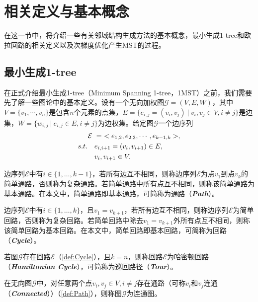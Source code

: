 \section{相关定义与基本概念}
\label{sec:NS_Method:相关定义与基本概念}
在这一节中，将介绍一些有关邻域结构生成方法的基本概念，最小生成1-tree和欧拉回路的相关定义以及次梯度优化产生MST的过程。

\subsection{最小生成1-tree}
\label{subsec:NS_Method:相关定义与基本概念:最小生成1-tree}
在正式介绍最小生成1-tree（Minimum Spanning 1-tree，1MST）之前，我们需要先了解一些图论中的基本定义。设有一个无向加权图$\mathcal{G} = (V, E, W)$，其中$V = \{ v_1, \cdots, v_n \}$是包含$n$个元素的点集，$E = \{ e_{i,j} = (v_i,v_j) \ | \ v_i,v_j \in V, i \not = j \}$是边集，$W = \{ w_{i,j} \ | \ e_{i,j} \in E, i \not = j\} $为边权集。给定图$\mathcal{G}$一个边序列
\begin{align}
    \label{eq:边序列}
    \mathcal{E} \ & = \ <e_{1,2}, e_{2,3}, \cdots, e_{k-1,k}>, \\
    s.t. \quad & e_{i,i+1} = (v_i, v_{i+1}) \in E, \notag  \\
    & v_i, v_{i+1} \in V. \notag 
\end{align}
\begin{definition}[简单通路]
    \label{def:Path}
    边序列$\mathcal{E}$中有$i \in \{ 1, \dots, k-1 \}$，若所有边互不相同，则称边序列$\mathcal{E}$为点$v_1$到点$v_k$的简单通路，否则称为复杂通路。若简单通路中所有点互不相同，则称该简单通路为基本通路。在本文中，简单通路即基本通路，可简称为通路（\emph{\textbf{Path}}）。
\end{definition}
\begin{definition}[简单回路]
    \label{def:Cycle}
    边序列$\mathcal{E}$中有$i \in \{ 1, \dots, k \}$，且$v_1=v_{k+1}$，若所有边互不相同，则称边序列$\mathcal{E}$为简单回路，否则称为复杂回路。若简单回路中除去$v_1=v_{k+1}$外所有点互不相同，则称该简单回路为基本回路。在本文中，简单回路即基本回路，可简称为回路（\emph{\textbf{Cycle}}）。
\end{definition}
\begin{definition}[哈密顿回路]
    \label{def:Hamiltonian Cycle}
    若图$\mathcal{G}$存在回路$\mathcal{E}$（\autoref{def:Cycle}），且$k=n$，则称回路$\mathcal{E}$为哈密顿回路（\emph{\textbf{Hamiltonian Cycle}}），可简称为巡回路径（\emph{\textbf{Tour}}）。
\end{definition}
\begin{definition}[连通图]
    \label{def:Connected Graph}
    在无向图$\mathcal{G}$中，对任意两个点$v_i, v_j \in V, i \not = j$存在通路（可称$v_i$和$v_j$连通（\emph{\textbf{Connected}}））（\autoref{def:Path}），则称图$\mathcal{G}$为连通图。
\end{definition}

